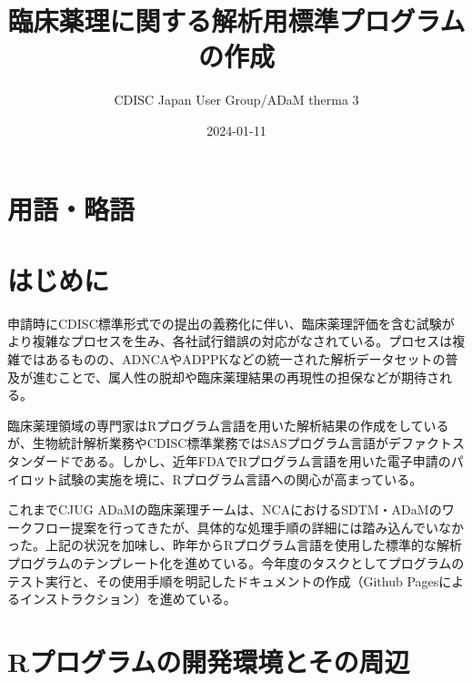 \documentclass[
  letterpaper,
  DIV=11,
  numbers=noendperiod]{scrreprt}
\title{臨床薬理に関する解析用標準プログラムの作成}
\author{CDISC Japan User Group/ADaM therma 3}
\date{2024-01-11}
\renewcommand*\contentsname{Table of contents}
\newcommand\contentsname{Table of contents}
\begin{document}
\maketitle
\ifdefined\Shaded\renewenvironment{Shaded}{\begin{tcolorbox}[breakable, frame hidden, interior hidden, borderline west={3pt}{0pt}{shadecolor}, sharp corners, boxrule=0pt, enhanced]}{\end{tcolorbox}}\fi

\renewcommand*\contentsname{Table of contents}
{
\hypersetup{linkcolor=}
\setcounter{tocdepth}{2}
\tableofcontents
}

\hypertarget{ux7528ux8a9eux7565ux8a9e}{%
\chapter{用語・略語}\label{ux7528ux8a9eux7565ux8a9e}}


\hypertarget{ux306fux3058ux3081ux306b}{%
\chapter{はじめに}\label{ux306fux3058ux3081ux306b}}

申請時にCDISC標準形式での提出の義務化に伴い、臨床薬理評価を含む試験がより複雑なプロセスを生み、各社試行錯誤の対応がなされている。プロセスは複雑ではあるものの、ADNCAやADPPKなどの統一された解析データセットの普及が進むことで、属人性の脱却や臨床薬理結果の再現性の担保などが期待される。

臨床薬理領域の専門家はRプログラム言語を用いた解析結果の作成をしているが、生物統計解析業務やCDISC標準業務ではSASプログラム言語がデファクトスタンダードである。しかし、近年FDAでRプログラム言語を用いた電子申請のパイロット試験の実施を境に、Rプログラム言語への関心が高まっている。

これまでCJUG
ADaMの臨床薬理チームは、NCAにおけるSDTM・ADaMのワークフロー提案を行ってきたが、具体的な処理手順の詳細には踏み込んでいなかった。上記の状況を加味し、昨年からRプログラム言語を使用した標準的な解析プログラムのテンプレート化を進めている。今年度のタスクとしてプログラムのテスト実行と、その使用手順を明記したドキュメントの作成（Github
Pagesによるインストラクション）を進めている。


\hypertarget{rux30d7ux30edux30b0ux30e9ux30e0ux306eux958bux767aux74b0ux5883ux3068ux305dux306eux5468ux8fba}{%
\chapter{Rプログラムの開発環境とその周辺}\label{rux30d7ux30edux30b0ux30e9ux30e0ux306eux958bux767aux74b0ux5883ux3068ux305dux306eux5468ux8fba}}
\end{document}
